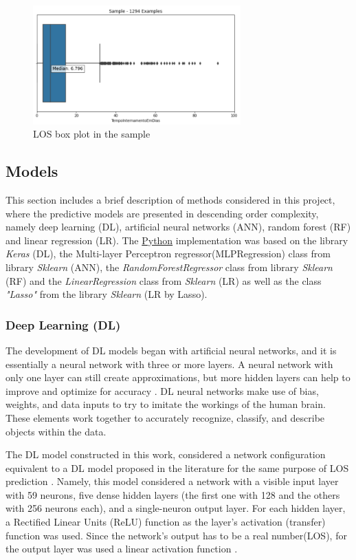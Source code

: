 \documentclass[journal]{IEEEtran} %
\begin{document}
\begin{figure}[htp]
    \centering
    \includegraphics[width=8cm]{Project1-Report_FAA/box_los_sample.png}
    \caption{LOS box plot in the sample}
    \label{fig:galaxy}
\end{figure}

\subsection{Models}
This section includes a brief description of methods considered in this project, where the predictive models are presented in descending order complexity, namely deep learning (DL), artificial neural networks (ANN), random forest (RF) and linear regression (LR).
The \hyperlink{https://www.python.org/}{Python} implementation was based on the library \textit{Keras} (DL), the Multi-layer Perceptron regressor(MLPRegression) class from library \textit{Sklearn} (ANN), the \textit{RandomForestRegressor} class from library \textit{Sklearn} (RF) and the \textit{LinearRegression} class from \textit{Sklearn} (LR) as well as the class \textit{"Lasso"} from the library \textit{Sklearn} (LR by Lasso).\newline

\subsubsection{Deep Learning (DL)}
The development of DL models began with artificial neural networks, and it is essentially a neural network with three or more layers. A neural network with only one layer can still create approximations, but more hidden layers can help to improve and optimize for accuracy \cite{diagnostics11122242}. DL neural networks make use of bias, weights, and data inputs to try to imitate the workings of the human brain. These elements work together to accurately recognize, classify, and describe objects within the data.

The DL model constructed in this work, considered a network configuration equivalent to a DL model proposed in the literature for the same purpose of LOS prediction \cite{Zolbanin2022}. Namely, this model considered a network with a visible input layer with 59 neurons, five dense hidden layers (the first one with 128 and the others with 256 neurons each), and a single-neuron output layer. For each hidden layer, a Rectified Linear Units (ReLU) function as the layer’s activation (transfer) function was used. Since the network’s output has to be a real number(LOS), for the output layer was used a linear activation function .\newline 
\end{document}
